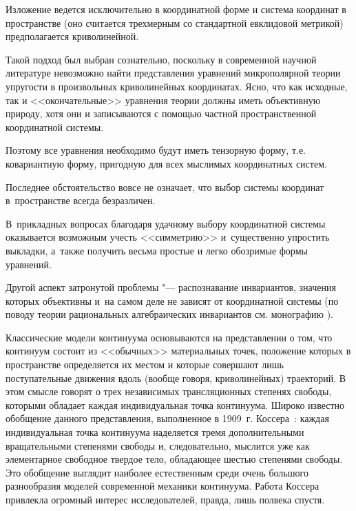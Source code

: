 Изложение ведется исключительно в координатной форме и система координат в пространстве (оно считается трехмерным со стандартной евклидовой метрикой) предполагается криволинейной. 

Такой подход был выбран сознательно, поскольку в современной научной литературе невозможно найти представления уравнений микрополярной теории упругости в произвольных криволинейных координатах. Ясно, что как исходные, так и <<окончательные>> уравнения теории должны иметь объективную природу, хотя они и записываются с помощью частной пространственной координатной системы. 

Поэтому все уравнения необходимо будут иметь тензорную форму, т.е. ковариантную форму, пригодную для всех мыслимых координатных систем. 

Последнее обстоятельство вовсе не означает, что выбор системы координат в~пространстве всегда безразличен. 

В~прикладных вопросах благодаря удачному выбору координатной системы оказывается возможным учесть <<симметрию>> и~существенно упростить выкладки, а~также получить весьма простые и легко обозримые формы уравнений. 

Другой аспект затронутой проблемы "--- распознавание инвариантов, значения которых объективны и~на самом деле не зависят от координатной системы (по поводу теории рациональных алгебраических инвариантов см. монографию \cite{Gurevich-1948}).



\smallskip





%

Классические модели континуума основываются на представлении о том, что континуум состоит из <<обычных>> материальных точек, положение которых в пространстве определяется их местом и которые совершают лишь поступательные движения вдоль (вообще говоря, криволинейных) траекторий. В этом смысле говорят о трех независимых трансляционных степенях свободы, которыми обладает каждая индивидуальная точка континуума. Широко известно обобщение данного представления, выполненное в 1909~г. Коссера~\cite{Kosserat}: каждая индивидуальная точка континуума наделяется тремя дополнительными вращательными степенями свободы и, следовательно, мыслится уже как элементарное свободное твердое тело, обладающее шестью степенями свободы. Это обобщение выглядит наиболее естественным среди очень большого разнообразия моделей современной механики континуума. Работа Коссера привлекла огромный интерес исследователей, правда, лишь полвека спустя.



